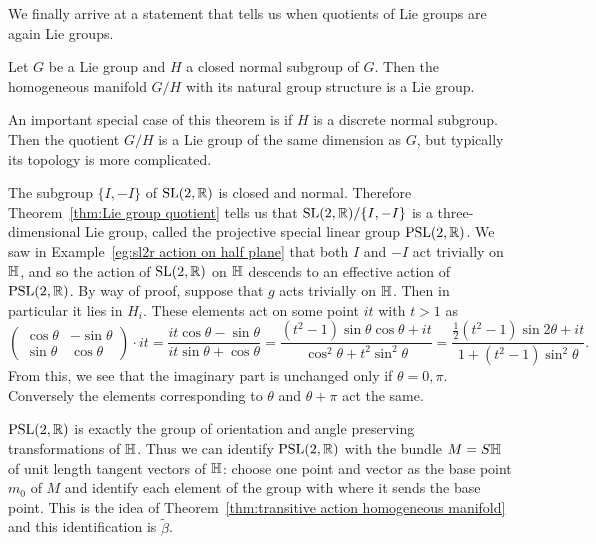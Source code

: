 We finally arrive at a statement that tells us when quotients of Lie groups are again Lie groups.

\begin{theorem}
\label{thm:Lie group quotient}
Let $G$ be a Lie group and $H$ a closed normal subgroup of $G$. Then the homogeneous manifold $G/H$ with its natural group structure is a Lie group.
\end{theorem}

An important special case of this theorem is if $H$ is a discrete normal subgroup.
Then the quotient $G/H$ is a Lie group of the same dimension as $G$, but typically its topology is more complicated.

\begin{example}
\label{eg:psl2r}
The subgroup $\{I,-I\}$ of $\mathrm{SL}(2,\mathbb{R})$ is closed and normal.
Therefore Theorem~\ref{thm:Lie group quotient} tells us that $\mathrm{SL}(2,\mathbb{R})/ \{I,-I\}$ is a three-dimensional Lie group, called the projective special linear group $\mathrm{PSL}(2,\mathbb{R})$.
We saw in Example~\ref{eg:sl2r action on half plane} that both $I$ and $-I$ act trivially on $\mathbb{H}$, and so the action of $\mathrm{SL}(2,\mathbb{R})$ on $\mathbb{H}$ descends to an effective action of $\mathrm{PSL}(2,\mathbb{R})$.
By way of proof, suppose that $g$ acts trivially on $\mathbb{H}$.
Then in particular it lies in $H_i$.
These elements act on some point $it$ with $t>1$ as 
\[
\begin{pmatrix}
\cos\theta & -\sin\theta \\ \sin\theta & \cos\theta
\end{pmatrix} \cdot it
= \frac{it \cos\theta - \sin\theta}{it \sin\theta + \cos\theta}
= \frac{(t^2-1) \sin\theta\cos\theta + it}{\cos^2\theta + t^2 \sin^2\theta}
= \frac{\tfrac{1}{2}(t^2-1) \sin2\theta + it}{1 + (t^2-1) \sin^2\theta}.
\]
From this, we see that the imaginary part is unchanged only if $\theta = 0,\pi$.
Conversely the elements corresponding to $\theta$ and $\theta + \pi$ act the same. 

$\mathrm{PSL}(2,\mathbb{R})$ is exactly the group of orientation and angle preserving transformations of $\mathbb{H}$.
Thus we can identify $\mathrm{PSL}(2,\mathbb{R})$ with the bundle $M = S\mathbb{H}$ of unit length tangent vectors of $\mathbb{H}$: choose one point and vector as the base point $m_0$ of $M$ and identify each element of the group with where it sends the base point.
This is the idea of Theorem~\ref{thm:transitive action homogeneous manifold} and this identification is $\tilde{\beta}$.
\end{example}

